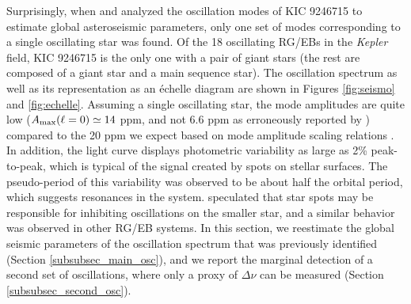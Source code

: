 Surprisingly, when \citet{gau13} and \citet{gau14} analyzed the oscillation modes of KIC 9246715 to estimate global asteroseismic parameters, only one set of modes corresponding to a single oscillating star was found. Of the 18 oscillating RG/EBs in the \emph{Kepler} field, KIC 9246715 is the only one with a pair of giant stars (the rest are composed of a giant star and a main sequence star). The oscillation spectrum as well as its representation as an \'echelle diagram are shown in Figures \ref{fig:seismo} and \ref{fig:echelle}. Assuming a single oscillating star, the mode amplitudes are quite low ($A_{\rm{max}}(\ell=0) \simeq 14$ ppm, and not 6.6 ppm as erroneously reported by \citealt{gau14}) compared to the 20 ppm we expect based on mode amplitude scaling relations \citep{cor13}. In addition, the light curve displays photometric variability as large as 2\% peak-to-peak, which is typical of the signal created by spots on stellar surfaces. The pseudo-period of this variability was observed to be about half the orbital period, which suggests resonances in the system. \citet{gau14} speculated that star spots may be responsible for inhibiting oscillations on the smaller star, and a similar behavior was observed in other RG/EB systems. In this section, we reestimate the global seismic parameters of the oscillation spectrum that was previously identified (Section \ref{subsubsec_main_osc}), and we report the marginal detection of a second set of oscillations, where only a proxy of $\Delta\nu$ can be measured (Section \ref{subsubsec_second_osc}).

